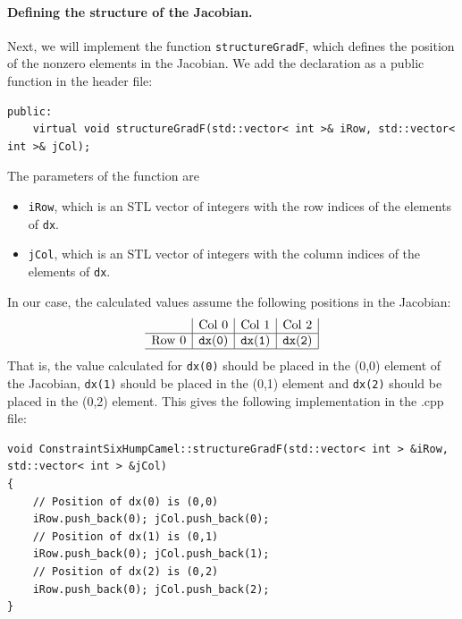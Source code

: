 \paragraph{Defining the structure of the Jacobian.} Next, we will implement the function \texttt{structureGradF}, which defines the position of the nonzero elements in the Jacobian. We add the declaration as a public function in the header file:
\begin{lstlisting}
public:
	virtual void structureGradF(std::vector< int >& iRow, std::vector< int >& jCol);
\end{lstlisting}
The parameters of the function are
\begin{itemize}
\item
\texttt{iRow}, which is an STL vector of integers with the row indices of the elements of \texttt{dx}.
\item
\texttt{jCol}, which is an STL vector of integers with the column indices of the elements of \texttt{dx}.
\end{itemize}
In our case, the calculated values assume the following positions in the Jacobian:
\[
\begin{array}{l|c|c|c|}
& \mathrm{Col\ 0} & \mathrm{Col\ 1} & \mathrm{Col\ 2} \\
\hline
\mathrm{Row\ 0} & \mathtt{dx(0)} & \mathtt{dx(1)} & \mathtt{dx(2)} \\
\hline
\end{array}
\]
That is, the value calculated for \texttt{dx(0)} should be placed in the (0,0) element of the Jacobian, \texttt{dx(1)} should be placed in the (0,1) element and \texttt{dx(2)} should be placed in the (0,2) element. This gives the following implementation in the .cpp file:
\begin{lstlisting}
void ConstraintSixHumpCamel::structureGradF(std::vector< int > &iRow, std::vector< int > &jCol)
{
	// Position of dx(0) is (0,0)
	iRow.push_back(0); jCol.push_back(0);
	// Position of dx(1) is (0,1)
	iRow.push_back(0); jCol.push_back(1);
	// Position of dx(2) is (0,2)
	iRow.push_back(0); jCol.push_back(2);
}
\end{lstlisting}

